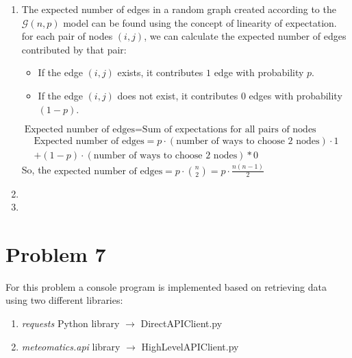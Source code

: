 \begin{enumerate}
	\item The expected number of edges in a random graph created according to the $\mathcal{G}(n,p)$ model can be found using the concept of linearity of expectation.
	for each pair of nodes $ (i, j) $, we can calculate the expected number of edges contributed by that pair:
	\begin{itemize}
	\item If the edge $ (i, j) $ exists, it contributes $ 1 $ edge with probability $ p $.
	\item If the edge $ (i, j) $ does not exist, it contributes $ 0 $ edges with probability $ (1 - p) $.
	\end{itemize}
	
	$ \text{Expected number of edges} = \text{Sum of expectations for all pairs of nodes} $
	\begin{multline*}
	\text{Expected number of edges} = p \cdot (\text{number of ways to choose 2 nodes}) \cdot 1 \\
	+ (1 - p) \cdot (\text{number of ways to choose 2 nodes}) * 0
	\end{multline*}
	So, the $ \text{expected number of edges} = p \cdot {n \choose 2}  = p \cdot \frac{n(n-1)}{2}$
	\item 
	\item 
	\end{enumerate}

	\newpage
	\section*{Problem 7}\label{sec:prob-7}
	For this problem a console program is implemented based on retrieving data using two different libraries:
	\begin{enumerate}
	\item 	\textit{requests} Python library $ \rightarrow $ DirectAPIClient.py
	\item 	\textit{meteomatics.api} library $ \rightarrow $ HighLevelAPIClient.py
	\end{enumerate}
	
	
